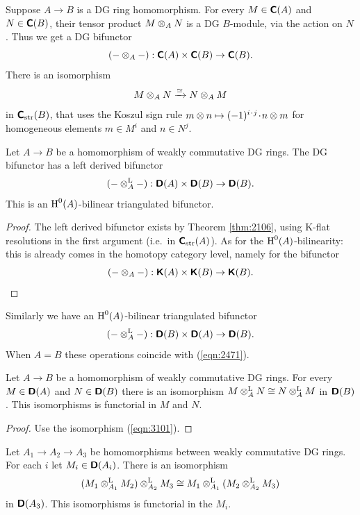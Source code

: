 Suppose $A \to B$ is a DG ring homomorphism. For every 
$M \in \boldsymbol{\mathsf{C}}(A)$ and $N \in \boldsymbol{\mathsf{C}}(B)$, their tensor product 
$M \otimes_A N$ is a DG $B$-module, via the action on $N$. 
Thus we get a DG bifunctor 
\begin{equation} \label{eqn:4955}
(- \otimes_A -) : \boldsymbol{\mathsf{C}}(A) \times \boldsymbol{\mathsf{C}}(B) \to \boldsymbol{\mathsf{C}}(B) . 
\end{equation}
There is an isomorphism 
\begin{equation} \label{eqn:3101}
M \otimes_A N \xrightarrow{\simeq} N \otimes_A M 
\end{equation}
in $\boldsymbol{\mathsf{C}}_{\mathrm{str}}(B)$, that uses the Koszul sign rule
$m \otimes n \mapsto (-1)^{i \mspace{1.5mu}{\cdot}\mspace{1.5mu} j} \mspace{1.5mu}{\cdot}\mspace{1.5mu} n \otimes m$
for homo\-geneous elements $m \in M^i$ and $n \in N^j$. 

\begin{prop} \label{prop:3103}
Let $A \to B$ be a homomorphism of weakly commutative DG rings. 
The DG bifunctor \tup{(\ref{eqn:4955})}
has a left derived bifunctor 
\[ (- \otimes^{\mathrm{L}}_{A} -) : \boldsymbol{\mathsf{D}}(A) \times \boldsymbol{\mathsf{D}}(B) \to \boldsymbol{\mathsf{D}}(B) . \]
This is an $\operatorname{H}^0(A)$-bilinear triangulated bifunctor.
\end{prop}

\begin{proof}
The left derived bifunctor exists by Theorem \ref{thm:2106}, using K-flat 
resolutions in the first argument (i.e.\ in $\boldsymbol{\mathsf{C}}_{\mathrm{str}}(A)$). 
As for the $\operatorname{H}^0(A)$-bilinearity: this is already comes in the homotopy 
category level, namely for the bifunctor 
\[ (- \otimes_{A} -) : \boldsymbol{\mathsf{K}}(A) \times \boldsymbol{\mathsf{K}}(B) \to \boldsymbol{\mathsf{K}}(B) . \qedhere \]
\end{proof}

Similarly we have an $\operatorname{H}^0(A)$-bilinear triangulated bifunctor
\[ (- \otimes^{\mathrm{L}}_{A} -) : \boldsymbol{\mathsf{D}}(B) \times \boldsymbol{\mathsf{D}}(A) \to \boldsymbol{\mathsf{D}}(B) . \]
When $A = B$ these operations coincide with (\ref{eqn:2471}). 

\begin{prop}[Symmetry] \label{prop:3102}
Let $A \to B$ be a homomorphism of weakly commutative DG rings. For every 
$M \in \boldsymbol{\mathsf{D}}(A)$ and $N \in \boldsymbol{\mathsf{D}}(B)$ there is an isomorphism 
$M \otimes^{\mathrm{L}}_{A} N \cong N \otimes^{\mathrm{L}}_{A} M$
in $\boldsymbol{\mathsf{D}}(B)$. This isomorphisms is functorial in $M$ and $N$.  
\end{prop}

\begin{proof}
Use the isomorphism (\ref{eqn:3101}). 
\end{proof}

\begin{prop}[Associativity] \label{prop:3100}
Let $A_1 \to A_2 \to A_3$ be homomorphisms between weakly commutative DG rings.
For each $i$ let $M_i \in \boldsymbol{\mathsf{D}}(A_i)$.
There is an isomorphism 
\[ (M_1 \otimes^{\mathrm{L}}_{A_1} M_2) \otimes^{\mathrm{L}}_{A_2} M_3 \cong 
M_1 \otimes^{\mathrm{L}}_{A_1} (M_2 \otimes^{\mathrm{L}}_{A_2} M_3) \]
in $\boldsymbol{\mathsf{D}}(A_3)$.
This isomorphisms is functorial in the $M_i$. 
\end{prop}

